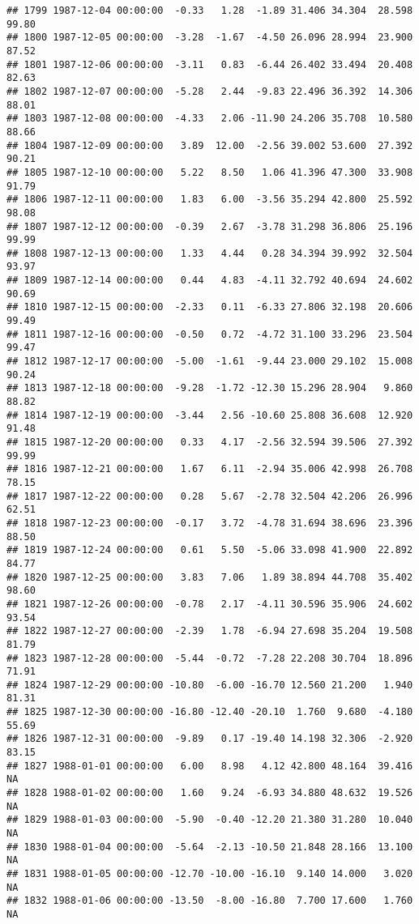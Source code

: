 \documentclass{article}\usepackage{graphicx, color}
\makeatletter
\newenvironment{kframe}{%
 \def\at@end@of@kframe{}%
 \ifinner\ifhmode%
  \def\at@end@of@kframe{\end{minipage}}%
  \begin{minipage}{\columnwidth}%
 \fi\fi%
 \def\FrameCommand##1{\hskip\@totalleftmargin \hskip-\fboxsep
 \colorbox{shadecolor}{##1}\hskip-\fboxsep
     \hskip-\linewidth \hskip-\@totalleftmargin \hskip\columnwidth}%
 \MakeFramed {\advance\hsize-\width
   \@totalleftmargin\z@ \linewidth\hsize
   \@setminipage}}%
 {\par\unskip\endMakeFramed%
 \at@end@of@kframe}
\newenvironment{knitrout}{}{} %
\makeatother
\begin{document}
\begin{knitrout}
\begin{kframe}
\begin{verbatim}
## 1799 1987-12-04 00:00:00  -0.33   1.28  -1.89 31.406 34.304  28.598  99.80
## 1800 1987-12-05 00:00:00  -3.28  -1.67  -4.50 26.096 28.994  23.900  87.52
## 1801 1987-12-06 00:00:00  -3.11   0.83  -6.44 26.402 33.494  20.408  82.63
## 1802 1987-12-07 00:00:00  -5.28   2.44  -9.83 22.496 36.392  14.306  88.01
## 1803 1987-12-08 00:00:00  -4.33   2.06 -11.90 24.206 35.708  10.580  88.66
## 1804 1987-12-09 00:00:00   3.89  12.00  -2.56 39.002 53.600  27.392  90.21
## 1805 1987-12-10 00:00:00   5.22   8.50   1.06 41.396 47.300  33.908  91.79
## 1806 1987-12-11 00:00:00   1.83   6.00  -3.56 35.294 42.800  25.592  98.08
## 1807 1987-12-12 00:00:00  -0.39   2.67  -3.78 31.298 36.806  25.196  99.99
## 1808 1987-12-13 00:00:00   1.33   4.44   0.28 34.394 39.992  32.504  93.97
## 1809 1987-12-14 00:00:00   0.44   4.83  -4.11 32.792 40.694  24.602  90.69
## 1810 1987-12-15 00:00:00  -2.33   0.11  -6.33 27.806 32.198  20.606  99.49
## 1811 1987-12-16 00:00:00  -0.50   0.72  -4.72 31.100 33.296  23.504  99.47
## 1812 1987-12-17 00:00:00  -5.00  -1.61  -9.44 23.000 29.102  15.008  90.24
## 1813 1987-12-18 00:00:00  -9.28  -1.72 -12.30 15.296 28.904   9.860  88.82
## 1814 1987-12-19 00:00:00  -3.44   2.56 -10.60 25.808 36.608  12.920  91.48
## 1815 1987-12-20 00:00:00   0.33   4.17  -2.56 32.594 39.506  27.392  99.99
## 1816 1987-12-21 00:00:00   1.67   6.11  -2.94 35.006 42.998  26.708  78.15
## 1817 1987-12-22 00:00:00   0.28   5.67  -2.78 32.504 42.206  26.996  62.51
## 1818 1987-12-23 00:00:00  -0.17   3.72  -4.78 31.694 38.696  23.396  88.50
## 1819 1987-12-24 00:00:00   0.61   5.50  -5.06 33.098 41.900  22.892  84.77
## 1820 1987-12-25 00:00:00   3.83   7.06   1.89 38.894 44.708  35.402  98.60
## 1821 1987-12-26 00:00:00  -0.78   2.17  -4.11 30.596 35.906  24.602  93.54
## 1822 1987-12-27 00:00:00  -2.39   1.78  -6.94 27.698 35.204  19.508  81.79
## 1823 1987-12-28 00:00:00  -5.44  -0.72  -7.28 22.208 30.704  18.896  71.91
## 1824 1987-12-29 00:00:00 -10.80  -6.00 -16.70 12.560 21.200   1.940  81.31
## 1825 1987-12-30 00:00:00 -16.80 -12.40 -20.10  1.760  9.680  -4.180  55.69
## 1826 1987-12-31 00:00:00  -9.89   0.17 -19.40 14.198 32.306  -2.920  83.15
## 1827 1988-01-01 00:00:00   6.00   8.98   4.12 42.800 48.164  39.416     NA
## 1828 1988-01-02 00:00:00   1.60   9.24  -6.93 34.880 48.632  19.526     NA
## 1829 1988-01-03 00:00:00  -5.90  -0.40 -12.20 21.380 31.280  10.040     NA
## 1830 1988-01-04 00:00:00  -5.64  -2.13 -10.50 21.848 28.166  13.100     NA
## 1831 1988-01-05 00:00:00 -12.70 -10.00 -16.10  9.140 14.000   3.020     NA
## 1832 1988-01-06 00:00:00 -13.50  -8.00 -16.80  7.700 17.600   1.760     NA

\end{verbatim}
\end{kframe}
\end{knitrout}
\end{document}
